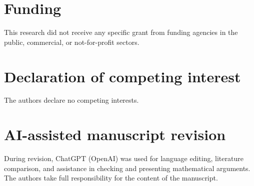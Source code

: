 \documentclass[11pt,a4paper]{article}
\newcommand{\1}{\mathbf{1}}
\begin{document}
\section*{Funding}
This research did not receive any specific grant from funding agencies in the
public, commercial, or not-for-profit sectors.

\section*{Declaration of competing interest}
The authors declare no competing interests.

\section*{AI-assisted manuscript revision}
During revision, ChatGPT (OpenAI) was used for language editing, literature comparison,
and assistance in checking and presenting mathematical arguments.
The authors take full responsibility for the content of the manuscript.

\end{document}
